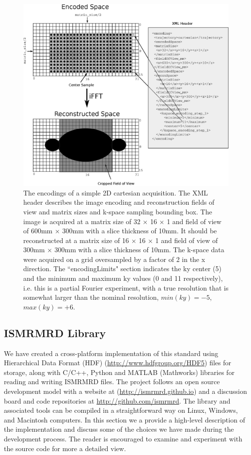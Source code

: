 \documentclass[12pt]{article}
\begin{document}
\begin{figure}
\begin{center}
\includegraphics[width=6in]{figure3_encoding_spaces.eps}
\caption{The encodings of a simple 2D cartesian acquisition.  The XML header describes the image encoding and reconstruction fields of view and matrix sizes and k-space sampling bounding box.  The image is acquired at a matrix size of 32 $\times$ 16 $\times$ 1 and field of view of 600mm $\times$ 300mm with a slice thickness of 10mm.  It should be reconstructed at a matrix size of 16 $\times$ 16 $\times$ 1 and field of view of 300mm $\times$ 300mm with a slice thickness of 10mm.   The k-space data were acquired on a grid oversampled by a factor of 2 in the x direction.  The ``encodingLimits" section indicates the ky center (5) and the minimum and maximum ky values (0 and 11 respectively), i.e. this is a partial Fourier experiment, with a true resolution that is somewhat larger than the nominal resolution, $min(ky)=-5$, $max(ky)=+6$.}
\label{fig:encoding}
\end{center}
\end{figure}


\subsection*{ISMRMRD Library}
We have created a cross-platform implementation of this standard using Hierarchical Data Format (HDF) (\url{http://www.hdfgroup.org/HDF5}) files for storage, along with C/C++, Python and MATLAB (Mathworks) libraries for reading and writing ISMRMRD files.  The project follows an open source development model with a website at (\url{http://ismrmrd.github.io}) and a discussion board and code repositories at \url{http://github.com/ismrmrd}.  The library and associated tools can be compiled in a straightforward way on Linux, Windows, and Macintosh computers.  In this section we a provide a high-level description of the implementation and discuss some of the choices we have made during the development process.  The reader is encouraged to examine and experiment with the source code for more a detailed view.
\end{document}
